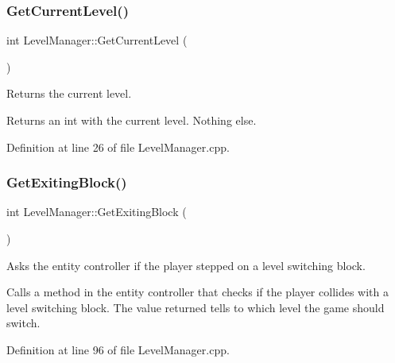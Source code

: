 \mbox{\label{class_level_manager_ae76fd820eb021bb71c2f369074697965}} 
\subsubsection{\texorpdfstring{Get\+Current\+Level()}{GetCurrentLevel()}}
{\footnotesize\ttfamily int Level\+Manager\+::\+Get\+Current\+Level (\begin{DoxyParamCaption}{ }\end{DoxyParamCaption})}



Returns the current level. 

Returns an int with the current level. Nothing else. 

Definition at line 26 of file Level\+Manager.\+cpp.

\mbox{\label{class_level_manager_aa9423f5861e8eebc14b175da2a2fea91}} 
\subsubsection{\texorpdfstring{Get\+Exiting\+Block()}{GetExitingBlock()}}
{\footnotesize\ttfamily int Level\+Manager\+::\+Get\+Exiting\+Block (\begin{DoxyParamCaption}{ }\end{DoxyParamCaption})}



Asks the entity controller if the player stepped on a level switching block. 

Calls a method in the entity controller that checks if the player collides with a level switching block. The value returned tells to which level the game should switch. 

Definition at line 96 of file Level\+Manager.\+cpp.

\mbox{\label{class_level_manager_a8b08bd6bc69bf5877a0e159df5f51af8}} 
